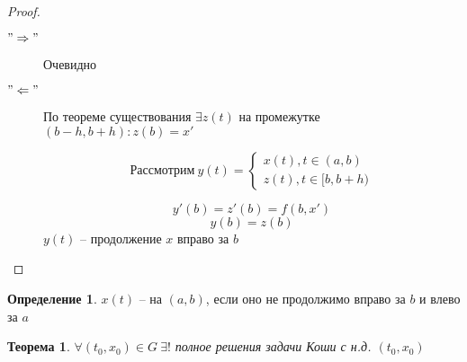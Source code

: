 \documentclass[a4paper]{article}
\theoremstyle{indented}
\newtheorem*{theorem}{Теорема}
\theoremstyle{definition}
\newtheorem*{defn}{Определение}
\theoremstyle{remark}
\begin{document}
\begin{proof}
  
  \begin{description}
    
  \item[$"\Rightarrow"$] Очевидно
  \item[$"\Leftarrow"$]  По теореме существования $\exists z(t)$ на промежутке $(b - h, b+h): z(b) = x'$

    \[Рассмотрим  \ y(t) = \begin{cases}
      x(t), t \in (a,b) \\
      z(t), t \in [b,b+h)
    \end{cases}\]

  \[y'(b) = z'(b) = f(b,x')\]
  \[y(b) = z(b)\]
    $y(t)$ -- продолжение $x$ вправо за $b$
  \end{description}
\end{proof}


\begin{defn}
  $x(t)$ --  на $(a,b)$, если оно не продолжимо вправо за $b$ и влево за $a$
\end{defn}

\begin{theorem}

  $\forall (t_0,x_0) \in G \ \exists !$ полное решения задачи Коши с н.д. $(t_0,x_0)$
\end{theorem}
\end{document}
